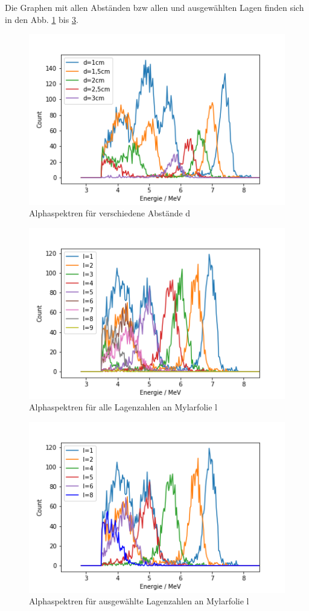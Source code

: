 Die Graphen mit allen Abständen bzw allen und ausgewählten Lagen finden sich in den Abb. \ref{bild:abstandAlle} bis \ref{bild:lagenAusgewaehlt}. \\

\begin{figure}[h]
    \centering
    \includegraphics[scale=0.65]{Bilder/abstandAlle.png}
    \caption{Alphaspektren für verschiedene Abstände d}
    \label{bild:abstandAlle}
\end{figure}

\begin{figure}[h]
    \centering
    \includegraphics[scale=0.65]{Bilder/lagenAlle.png}
    \caption{Alphaspektren für alle Lagenzahlen an Mylarfolie l}
    \label{bild:lagenAlle}
\end{figure}

\begin{figure}[h]
    \centering
    \includegraphics[scale=0.65]{Bilder/lagenAusgewaehlt.png}
    \caption{Alphaspektren für ausgewählte Lagenzahlen an Mylarfolie l}
    \label{bild:lagenAusgewaehlt}
\end{figure}

